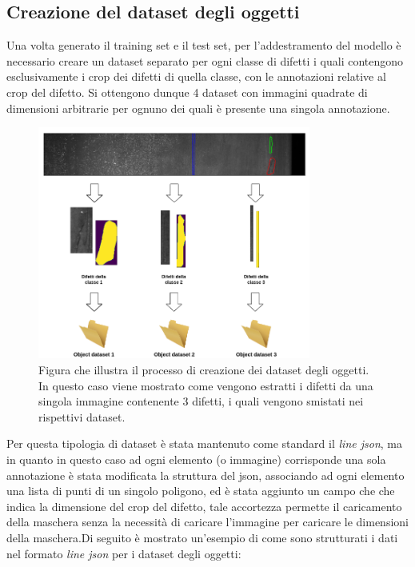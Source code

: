 \subsection{Creazione del dataset degli oggetti}
Una volta generato il training set e il test set, per l'addestramento del modello è necessario creare un dataset separato per ogni
classe di difetti i quali contengono esclusivamente i crop dei difetti di quella classe, con le annotazioni relative al crop del difetto.
Si ottengono dunque 4 dataset con immagini quadrate di dimensioni arbitrarie per ognuno dei quali è presente una singola annotazione.

\begin{figure}[H]
    \centering
    \includegraphics[width=0.8\textwidth]{imgs/Coigan/Object_dataset_generation.drawio.png}
    \caption{Figura che illustra il processo di creazione dei dataset degli oggetti. In questo caso viene mostrato come
    vengono estratti i difetti da una singola immagine contenente 3 difetti, i quali vengono smistati nei rispettivi dataset.}
    \label{fig:object_dataset_generation}
\end{figure}

Per questa tipologia di dataset è stata mantenuto come standard il \textit{line json}, ma in quanto in questo caso ad ogni elemento (o immagine) 
corrisponde una sola annotazione è stata modificata la struttura del json, associando ad ogni elemento una lista di punti di un singolo poligono,
ed è stata aggiunto un campo che che indica la dimensione del crop del difetto, tale accortezza permette il caricamento della maschera
senza la necessità di caricare l'immagine per caricare le dimensioni della maschera.Di seguito è mostrato un'esempio di come sono strutturati 
i dati nel formato \textit{line json} per i dataset degli oggetti:

